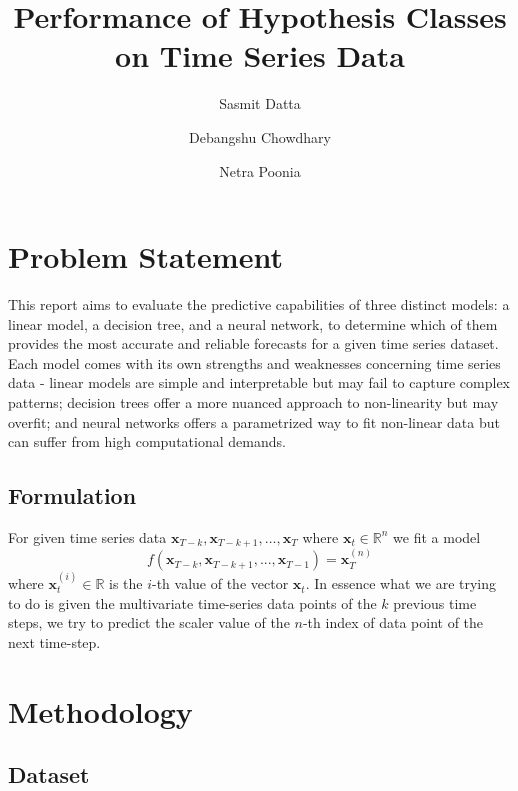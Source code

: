 \documentclass[12pt,a4paper]{article}
\title{\textbf{Performance of Hypothesis Classes on Time Series Data}}
\author{
  Sasmit Datta\and
  Debangshu Chowdhary\and
  Netra Poonia
}
\date{}
\begin{document}
\maketitle

\section{Problem Statement}
This report aims to evaluate the predictive capabilities of three distinct models: a linear model, a decision tree, and a neural network, to determine which of them provides the most accurate and reliable forecasts for a given time series dataset. Each model comes with its own strengths and weaknesses concerning time series data - linear models are simple and interpretable but may fail to capture complex patterns; decision trees offer a more nuanced approach to non-linearity but may overfit; and neural networks offers a parametrized way to fit non-linear data but can suffer from high computational demands.
\subsection{Formulation}
For given time series data $\mathbf{x}_{T-k},\mathbf{x}_{T-k+1},\hdots,\mathbf{x}_{T}$ where $\mathbf{x}_t\in \mathbb{R}^n$ we fit a model 
\begin{equation}
f(\mathbf{x}_{T-k},\mathbf{x}_{T-k+1},...,\mathbf{x}_{T-1}) = \mathbf{x}_{T}^{(n)}
\end{equation}
where $\mathbf{x}_{t}^{(i)}\in \mathbb{R}$ is the $i$-th value of the vector $\mathbf{x}_{t}$. In essence what we are trying to do is given the multivariate time-series data points of the $k$ previous time steps, we try to predict the scaler value of the $n$-th index of data point of the next time-step.

\section{Methodology}

\subsection{Dataset}


\end{document}

